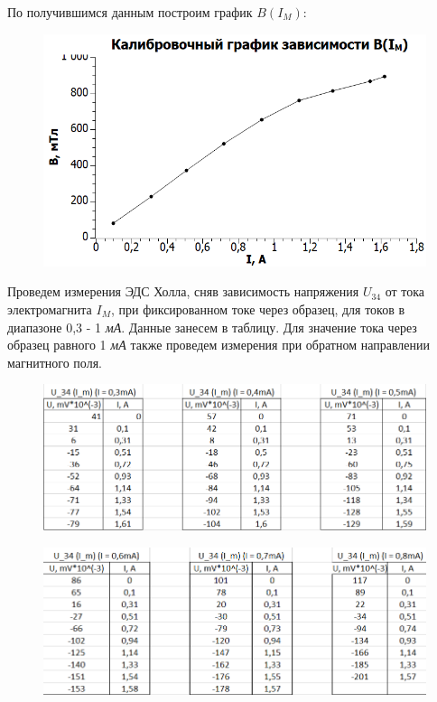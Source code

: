 \documentclass[11pt]{article}
\begin{document}
\vspace{0.5cm}

По получившимся данным построим график $B(I_M)$:

\begin{figure}[h!]
\centering
\includegraphics[scale=1]{Graph2.png}
\label{fig:Image1}
\end{figure}

\vspace{0.5cm}

Проведем измерения ЭДС Холла, сняв зависимость напряжения $U_{34}$ от тока электромагнита $I_M$, при фиксированном токе через образец, для токов в диапазоне 0,3 - 1 \textit{мА}. Данные занесем в таблицу. Для значение тока через образец равного 1 \textit{мА} также проведем измерения при обратном направлении магнитного поля.

\begin{figure}[h!]
\centering
\includegraphics[scale=1]{table2.png}
\label{fig:Image1}
\end{figure}

\begin{figure}[h!]
\centering
\includegraphics[scale=1]{table3.png}
\label{fig:Image1}
\end{figure}
\end{document}
